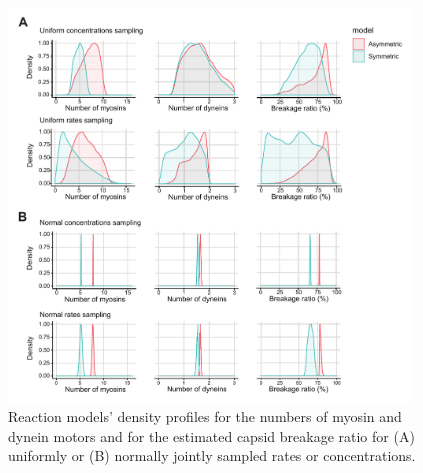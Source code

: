 \begin{figure}
\begin{center}
\includegraphics[width=0.95\textwidth, trim={0cm 0cm 0cm 0cm}, clip]{D_chapters/2_ReactionModel/densitiesRCsupplementary.pdf}
\caption[Molecular motor and capsid breakage density distributions based on joined sampling of rates or concentrations]%
{Reaction models' density profiles for the numbers of myosin and dynein motors and for the estimated capsid breakage ratio for (A) uniformly or (B) normally jointly sampled rates or concentrations.}
\label{figure:densitiesRCsupplementary}
\end{center}
\end{figure}

